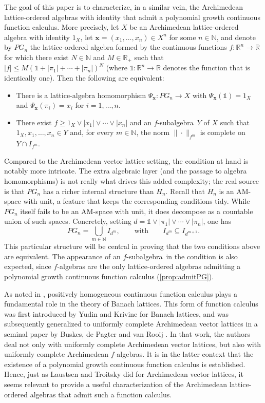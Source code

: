\documentclass{amsart}
\theoremstyle{plain}
\theoremstyle{definition}
\theoremstyle{remark}
\newcommand\N{\ensuremath{\mathbb{N}}}
\newcommand\R{\ensuremath{\mathbb{R}}}
\newcommand{\one}{\mathbb{1}}
\newcommand{\falg}{$f\!$-algebra}
\newcommand{\fsubalg}{$f\!$-subalgebra}
\begin{document}
The goal of this paper is to characterize, in a similar vein, the
Archimedean lattice-ordered algebras with identity that admit a
polynomial growth continuous function calculus. More precisely, let $X$
be an Archimedean lattice-ordered algebra with identity $1_X$, let $\bm
x=(x_1,\ldots ,x_n) \in X^{n}$ for some $n \in \N$, and denote by
$PG_n$ the lattice-ordered algebra formed by the continuous
functions $f\colon \R^{n}\to \R$ for which there exist $N \in \N$ and
$M \in \R_+$ such that $|f|\le M(\one + |\pi _1| + \cdots +|\pi
_n|)^{N}$ (where $\one\colon \R^{n}\to \R$ denotes the function that
is identically one). Then the following are equivalent:
\begin{itemize}
    \item There is a lattice-algebra homomorphism $\Psi _{\bm x}\colon
        PG_n\to X$ with $\Psi _{\bm x}(\one)=1_X$ and $\Psi _{\bm
        x}(\pi _i)=x_i$ for $i=1,\ldots ,n$.
    \item There exist $f\ge 1_X \vee |x_1| \vee \cdots \vee |x_n|$ and
        an \fsubalg\ $Y$ of $X$ such that $1_X,x_1,\ldots ,x_n \in Y$
        and, for every $m \in \N$, the norm $\|{\cdot }\|_{f^{m}}$ is
        complete on $Y\cap I_{f^{m}}$.
\end{itemize}
Compared to the Archimedean vector lattice setting, the condition at
hand is notably more intricate. The extra algebraic layer (and the
passage to algebra homomorphisms) is not really what drives this added
complexity; the real source is that $PG_n$ has a richer internal
structure than $H_n$. Recall that $H_n$ is an AM-space with unit, a
feature that keeps the corresponding conditions tidy. While $PG_n$
itself fails to be an AM-space with unit, it does decompose as a
countable union of such spaces. Concretely, setting $d = \one \vee
|\pi_1| \vee \cdots \vee |\pi_n|$, one has
  \begin{equation*}
      PG_n = \bigcup_{m \in \N} I_{d^{m}}, \qquad \text{with} \qquad I_{d^{m}} \subseteq I_{d^{m+1}}.
  \end{equation*}
This particular structure will be central in proving that the two
conditions above are equivalent. The appearance of an \fsubalg\ in the
condition is also expected, since \falg s are the only lattice-ordered
algebras admitting a polynomial growth continuous function calculus
(\cref{prop:admitPG}).

As noted in \cite{laustsen_troitsky2020},
positively homogeneous continuous function calculus plays a
fundamental role in the theory of Banach lattices. This form of
function calculus was first introduced by Yudin \cite{yudin1939} and
Krivine \cite{krivine1974} for
Banach lattices, and was subsequently generalized to uniformly
complete Archimedean vector lattices in a seminal paper by Buskes, de
Pagter and van Rooij \cite{buskes_depagter_vanrooij1991}. In that work, the authors deal not only with
uniformly complete Archimedean vector lattices, but also with
uniformly complete Archimedean \falg s. It is in the latter context
that the existence of a polynomial growth continuous function calculus
is established. Hence, just as Laustsen and Troitsky did for Archimedean
vector lattices, it seems relevant to provide a useful characterization
of the Archimedean lattice-ordered algebras that admit such a function
calculus.
\end{document}
